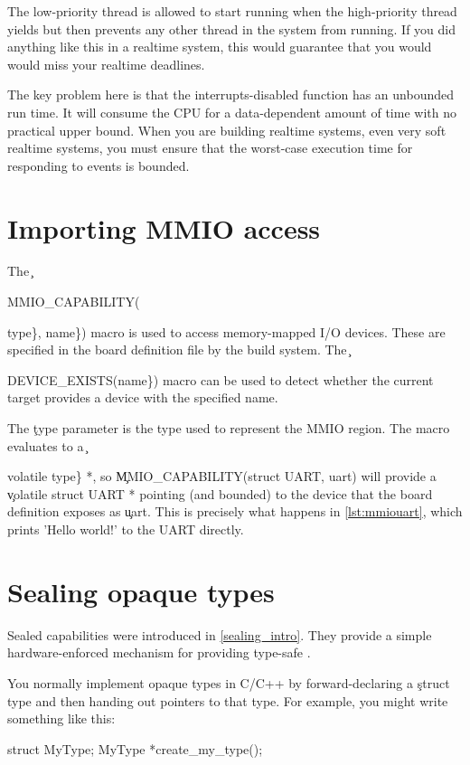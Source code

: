{{The low-priority thread is allowed to start running when the high-priority thread yields but then prevents any other thread in the system from running.
If you did anything like this in a realtime system, this would guarantee that you would would miss your realtime deadlines.

The key problem here is that the interrupts-disabled function has an unbounded run time.
It will consume the CPU for a data-dependent amount of time with no practical upper bound.
When you are building realtime systems, even very soft realtime systems, you must ensure that the worst-case execution time for responding to events is bounded.

\section{Importing MMIO access}

The \c{MMIO_CAPABILITY({type\}, {name\})} macro is used to access memory-mapped I/O devices.
These are specified in the board definition file by the build system.
The \c{DEVICE_EXISTS({name\})} macro can be used to detect whether the current target provides a device with the specified name.

The \c{type} parameter is the type used to represent the MMIO region.
The macro evaluates to a \c{volatile {type\} *}, so \c{MMIO_CAPABILITY(struct UART, uart)} will provide a \c{volatile struct UART *} pointing (and bounded) to the device that the board definition exposes as \c{uart}.
This is precisely what happens in \ref{lst:mmiouart}, which prints 'Hello world!' to the UART directly.

\codelisting[filename=examples/raw_uart/raw_uart.cc,marker=uart,label=lst:mmiouart,caption="Retrieving a pointer to a UART's MMIO space and using it."]{}

\section{Sealing opaque types}

Sealed capabilities were introduced in \ref{sealing_intro}.
They provide a simple hardware-enforced mechanism for providing type-safe .

You normally implement opaque types in C/C++ by forward-declaring a \c{struct} type and then handing out pointers to that type.
For example, you might write something like this:

\begin{cxxsnippet}
struct MyType;
MyType *create_my_type();
\end{cxxsnippet}

}}}}}}
